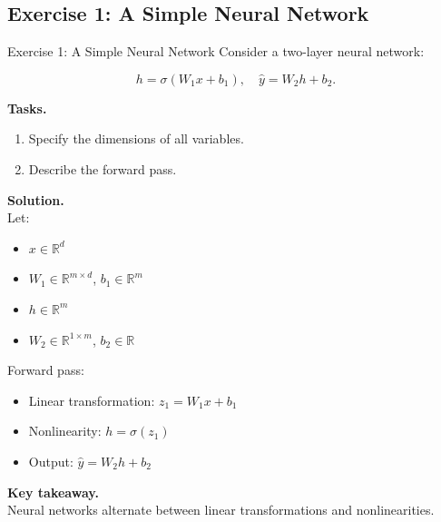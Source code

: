 \documentclass[aspectratio=169,11pt]{beamer}
\begin{document}
\subsection{Exercise 1: A Simple Neural Network}
\begin{frame}[t,allowframebreaks]{Exercise 1: A Simple Neural Network}
\small
Consider a two-layer neural network:

\[
h = \sigma(W_1 x + b_1), \quad
\hat{y} = W_2 h + b_2.
\]

\textbf{Tasks.}\\ \begin{enumerate}
    \item Specify the dimensions of all variables.
    \item Describe the forward pass.
\end{enumerate}

\textbf{Solution.}\\ Let:
\begin{itemize}
    \item $x \in \mathbb{R}^d$
    \item $W_1 \in \mathbb{R}^{m \times d}$, $b_1 \in \mathbb{R}^m$
    \item $h \in \mathbb{R}^m$
    \item $W_2 \in \mathbb{R}^{1 \times m}$, $b_2 \in \mathbb{R}$
\end{itemize}

Forward pass:
\begin{itemize}
    \item Linear transformation: $z_1 = W_1 x + b_1$
    \item Nonlinearity: $h = \sigma(z_1)$
    \item Output: $\hat{y} = W_2 h + b_2$
\end{itemize}

\textbf{Key takeaway.}\\ Neural networks alternate between linear transformations and nonlinearities.
\end{frame}
\end{document}
